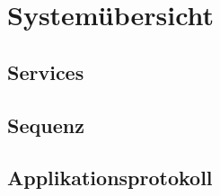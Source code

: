 \section{Systemübersicht}

\subsection{Services}

\subsection{Sequenz}

\subsection{Applikationsprotokoll}
